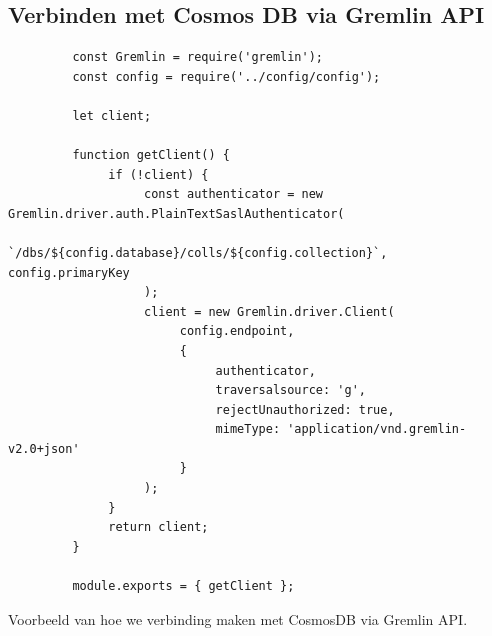 \chapter{}{\label{ch:Bijlagen}}
\section{Verbinden met Cosmos DB via Gremlin API}
\begin{listing} [H]
    \begin{verbatim}
         const Gremlin = require('gremlin');
         const config = require('../config/config');

         let client;

         function getClient() {
              if (!client) {
                   const authenticator = new Gremlin.driver.auth.PlainTextSaslAuthenticator(
                        `/dbs/${config.database}/colls/${config.collection}`, config.primaryKey
                   );
                   client = new Gremlin.driver.Client(
                        config.endpoint,
                        {
                             authenticator,
                             traversalsource: 'g',
                             rejectUnauthorized: true,
                             mimeType: 'application/vnd.gremlin-v2.0+json'
                        }
                   );
              }
              return client;
         }

         module.exports = { getClient };
    \end{verbatim}
    \caption[Voorbeeld verbinding met CosmosDB via Gremlin API.]{\label{fig:gremlinClient}Voorbeeld van hoe we verbinding maken met CosmosDB via Gremlin API.}
\end{listing}

